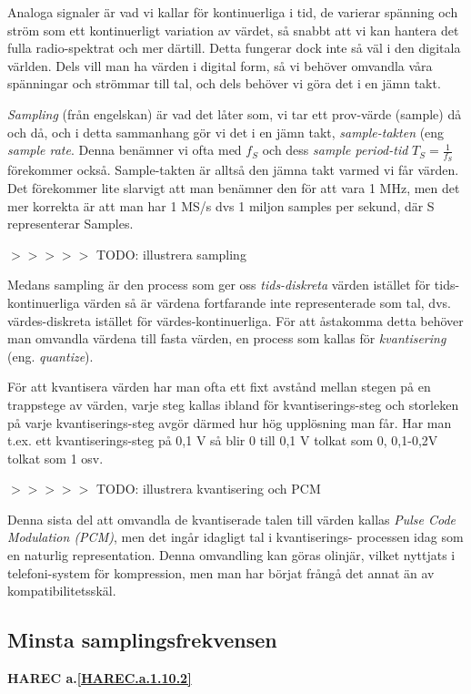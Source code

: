 \begin{rev-nytt}[MAD]

Analoga signaler är vad vi kallar för kontinuerliga i tid, de varierar spänning
och ström som ett kontinuerligt variation av värdet, så snabbt att vi kan
hantera det fulla radio-spektrat och mer därtill. Detta fungerar dock inte så
väl i den digitala världen. Dels vill man ha värden i digital form, så vi
behöver omvandla våra spänningar och strömmar till tal, och dels behöver vi
göra det i en jämn takt.

\emph{Sampling} (från engelskan) är vad det låter som, vi tar ett prov-värde
(sample) då och då, och i detta sammanhang gör vi det i en jämn takt,
\emph{sample-takten} (eng \emph{sample rate}. Denna benämner vi ofta med
\(f_S\) och dess \emph{sample period-tid} \(T_S=\frac{1}{f_S}\) förekommer
också. Sample-takten är alltså den jämna takt varmed vi får värden. Det
förekommer lite slarvigt att man benämner den för att vara 1 MHz, men det mer
korrekta är att man har 1 MS/s dvs 1 miljon samples per sekund, där S
representerar Samples.

$>>>>>$ TODO: illustrera sampling

Medans sampling är den process som ger oss \emph{tids-diskreta} värden istället
för tids-kontinuerliga värden så är värdena fortfarande inte representerade som
tal, dvs. värdes-diskreta istället för värdes-kontinuerliga. För att åstakomma
detta behöver man omvandla värdena till fasta värden, en process som kallas för
\emph{kvantisering} (eng. \emph{quantize}).

För att kvantisera värden har man ofta ett fixt avstånd mellan stegen på en
trappstege av värden, varje steg kallas ibland för kvantiserings-steg och
storleken på varje kvantiserings-steg avgör därmed hur hög upplösning man får.
Har man t.ex. ett kvantiserings-steg på 0,1 V så blir 0 till 0,1 V tolkat som
0, 0,1-0,2V tolkat som 1 osv.

$>>>>>$ TODO: illustrera kvantisering och PCM

Denna sista del att omvandla de kvantiserade talen till värden kallas
\emph{Pulse Code Modulation (PCM)}, men det ingår idagligt tal i kvantiserings-
processen idag som en naturlig representation. Denna omvandling kan göras
olinjär, vilket nyttjats i telefoni-system för kompression, men man har börjat
frångå det annat än av kompatibilitetsskäl.

\end{rev-nytt}

\subsection{Minsta samplingsfrekvensen}
\textbf{HAREC a.\ref{HAREC.a.1.10.2}\label{myHAREC.a.1.10.2}}

